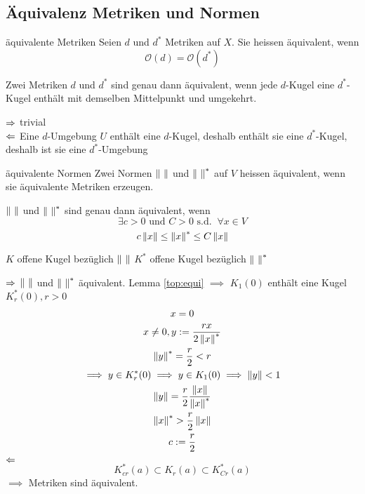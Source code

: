 \subsection{Äquivalenz Metriken und Normen}
\begin{Def}{äquivalente Metriken}
  Seien $d$ und $d^*$ Metriken auf $X$. Sie heissen äquivalent, wenn
  \[\mathcal{O}(d)=\mathcal{O}(d^*)\]
\end{Def}
\begin{Lem}
  Zwei Metriken $d$ und $d^*$ sind genau dann äquivalent, wenn jede $d$-Kugel eine $d^*$-Kugel enthält mit demselben Mittelpunkt und umgekehrt.
  \label{top:equi}
\end{Lem}
\begin{Bew}
  $\Rightarrow$ trivial\\
  $\Leftarrow$ Eine $d$-Umgebung $U$ enthält eine $d$-Kugel, deshalb enthält sie eine $d^*$-Kugel, deshalb ist sie eine $d^*$-Umgebung
\end{Bew}
\begin{Def}{äquivalente Normen}
  Zwei Normen $\left\| \  \right\|$ und $\Norm{\ }^*$ auf $V$ heissen äquivalent, wenn sie äquivalente Metriken erzeugen.
\end{Def}
\begin{Lem}
  $\left\| \  \right\|$ und $\Norm{\ }^*$ sind genau dann äquivalent, wenn
  \[\exists c>0 \text{ und } C>0 \text{ s.d. }\ \forall x\in V\]
  \[c\left\| x \right\|\leq \left\| x \right\|^*\leq C\left\| x \right\|\]
\end{Lem}
\begin{Not}
  $K$ offene Kugel bezüglich $\left\| \  \right\|$ 
  $K^*$ offene Kugel bezüglich $\Norm{\ }^*$ 
\end{Not}
\begin{Bew}
  $\Rightarrow$ $\left\| \  \right\|$ und $\Norm{\ }^*$ äquivalent. Lemma \ref{top:equi} $\implies$ $K_1(0)$ enthält eine Kugel $K_r^*(0), r>0$
  \begin{gather*}
    x=0\\
    x\neq 0, y:=\frac{rx}{2\left\| x \right\|^*}\\
    \left\| y \right\|^*=\frac{r}{2}<r\\
    \implies y\in K_r^*(0)\implies y\in K_1(0)\implies \left\| y \right\|<1\\
    \left\| y \right\|=\frac{r}{2}\frac{\left\| x \right\|}{\left\| x \right\|^*}\\
    \left\| x \right\|^*>\frac{r}{2}\left\| x \right\|\\
    c:=\frac{r}{2}
  \end{gather*}
  $\Leftarrow$ \[K^*_{cr}(a)\subset K_r(a)\subset K_{Cr}^*(a)\]
  $\implies$ Metriken sind äquivalent.
\end{Bew}
